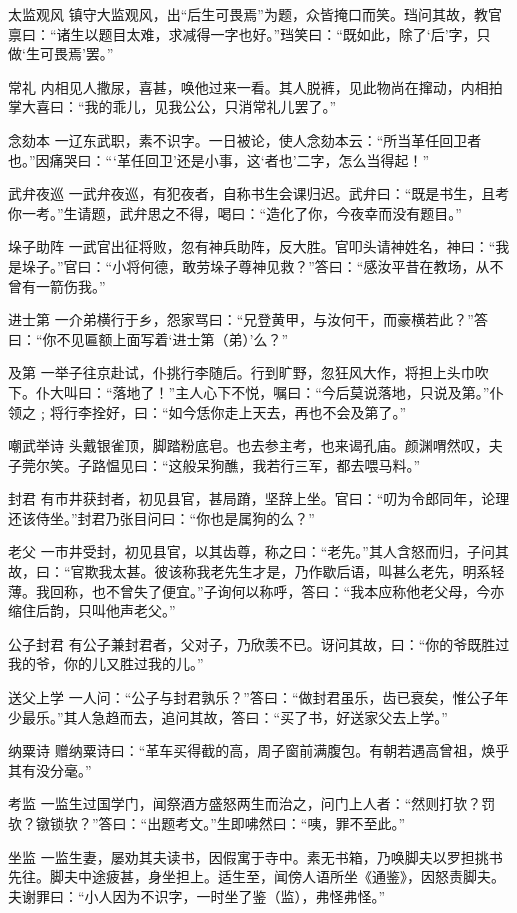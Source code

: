 \documentclass[12pt,UTF8]{ctexbook}
\begin{document}
太监观风
镇守大监观风，出“后生可畏焉”为题，众皆掩口而笑。珰问其故，教官禀曰：“诸生以题目太难，求减得一字也好。”珰笑曰：“既如此，除了‘后’字，只做‘生可畏焉’罢。”

常礼
内相见人撒尿，喜甚，唤他过来一看。其人脱裤，见此物尚在撺动，内相拍掌大喜曰：“我的乖儿，见我公公，只消常礼儿罢了。”

念劾本
一辽东武职，素不识字。一日被论，使人念劾本云：“所当革任回卫者也。”因痛哭曰：“‘革任回卫’还是小事，这‘者也’二字，怎么当得起！”

武弁夜巡
一武弁夜巡，有犯夜者，自称书生会课归迟。武弁曰：“既是书生，且考你一考。”生请题，武弁思之不得，喝曰：“造化了你，今夜幸而没有题目。”

垛子助阵
一武官出征将败，忽有神兵助阵，反大胜。官叩头请神姓名，神曰：“我是垛子。”官曰：“小将何德，敢劳垛子尊神见救？”答曰：“感汝平昔在教场，从不曾有一箭伤我。”

进士第
一介弟横行于乡，怨家骂曰：“兄登黄甲，与汝何干，而豪横若此？”答曰：“你不见匾额上面写着‘进士第（弟）’么？”

及第
一举子往京赴试，仆挑行李随后。行到旷野，忽狂风大作，将担上头巾吹下。仆大叫曰：“落地了！”主人心下不悦，嘱曰：“今后莫说落地，只说及第。”仆领之﹔将行李拴好，曰：“如今恁你走上天去，再也不会及第了。”

嘲武举诗
头戴银雀顶，脚踏粉底皂。也去参主考，也来谒孔庙。颜渊喟然叹，夫子莞尔笑。子路愠见曰：“这般呆狗醮，我若行三军，都去喂马料。”

封君
有市井获封者，初见县官，甚局蹐，坚辞上坐。官曰：“叨为令郎同年，论理还该侍坐。”封君乃张目问曰：“你也是属狗的么？”

老父
一市井受封，初见县官，以其齿尊，称之曰：“老先。”其人含怒而归，子问其故，曰：“官欺我太甚。彼该称我老先生才是，乃作歇后语，叫甚么老先，明系轻薄。我回称，也不曾失了便宜。”子询何以称呼，答曰：“我本应称他老父母，今亦缩住后韵，只叫他声老父。”

公子封君
有公子兼封君者，父对子，乃欣羡不已。讶问其故，曰：“你的爷既胜过我的爷，你的儿又胜过我的儿。”

送父上学
一人问：“公子与封君孰乐？”答曰：“做封君虽乐，齿已衰矣，惟公子年少最乐。”其人急趋而去，追问其故，答曰：“买了书，好送家父去上学。”

纳粟诗
赠纳粟诗曰：“革车买得截的高，周子窗前满腹包。有朝若遇高曾祖，焕乎其有没分毫。”

考监
一监生过国学门，闻祭酒方盛怒两生而治之，问门上人者：“然则打欤？罚欤？镦锁欤？”答曰：“出题考文。”生即咈然曰：“咦，罪不至此。”

坐监
一监生妻，屡劝其夫读书，因假寓于寺中。素无书箱，乃唤脚夫以罗担挑书先往。脚夫中途疲甚，身坐担上。适生至，闻傍人语所坐《通鉴》，因怒责脚夫。夫谢罪曰：“小人因为不识字，一时坐了鉴（监），弗怪弗怪。”
\end{document}
